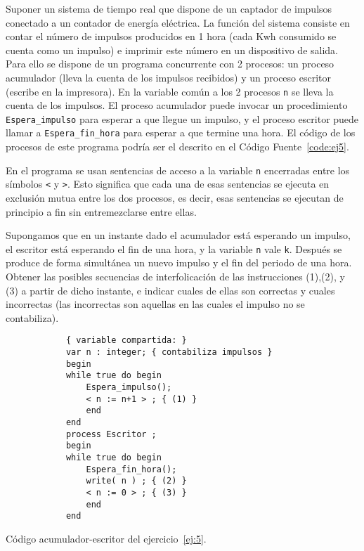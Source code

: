 \begin{ejercicio} \label{ej:5}
    Suponer un sistema de tiempo real que dispone de un captador de impulsos conectado a un
    contador de energía eléctrica. La función del sistema consiste en contar el número de impulsos
    producidos en 1 hora (cada Kwh consumido se cuenta como un impulso) e imprimir este número
    en un dispositivo de salida. Para ello se dispone de un programa concurrente con 2 procesos: un
    proceso acumulador (lleva la cuenta de los impulsos recibidos) y un proceso escritor (escribe
    en la impresora). En la variable común a los 2 procesos \verb|n| se lleva la cuenta de los impulsos. El
    proceso acumulador puede invocar un procedimiento \verb|Espera_impulso| para esperar a que llegue
    un impulso, y el proceso escritor puede llamar a \verb|Espera_fin_hora| para esperar a que termine
    una hora. El código de los procesos de este programa podría ser el descrito en el Código Fuente~\ref{code:ej5}.
    \begin{observacion}
        En el programa se usan sentencias de acceso a la variable \verb|n| encerradas entre los símbolos \verb|<| y
        \verb|>|. Esto significa que cada una de esas sentencias se ejecuta en exclusión mutua entre los dos
        procesos, es decir, esas sentencias se ejecutan de principio a fin sin entremezclarse entre ellas.
    \end{observacion}

    
    Supongamos que en un instante dado el acumulador está esperando un impulso, el escritor está
    esperando el fin de una hora, y la variable \verb|n| vale \verb|k|. Después se produce de forma simultánea
    un nuevo impulso y el fin del periodo de una hora.
    Obtener las posibles secuencias de interfolicación de las instrucciones (1),(2), y (3) a partir de
    dicho instante, e indicar cuales de ellas son correctas y cuales incorrectas (las incorrectas son
    aquellas en las cuales el impulso no se contabiliza).
    \begin{listing}
        \begin{verbatim}
            { variable compartida: }
            var n : integer; { contabiliza impulsos }
            begin
            while true do begin
                Espera_impulso();
                < n := n+1 > ; { (1) }
                end
            end
            process Escritor ;
            begin
            while true do begin
                Espera_fin_hora();
                write( n ) ; { (2) }
                < n := 0 > ; { (3) }
                end
            end
        \end{verbatim}
        \caption{Código acumulador-escritor del ejercicio~\ref{ej:5}.}
        \label{code:ej5}
    \end{listing}


\end{ejercicio}
